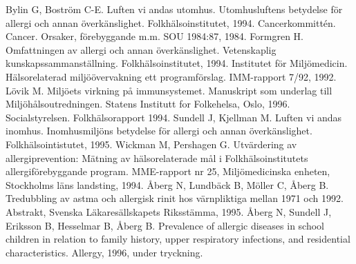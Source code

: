 Bylin G, Boström C-E. Luften vi andas utomhus. Utomhusluftens betydelse för allergi och annan överkänslighet. Folkhälsoinstitutet, 1994.
Cancerkommittén. Cancer. Orsaker, förebyggande m.m. SOU 1984:87, 1984.
Formgren H. Omfattningen av allergi och annan överkänslighet. Vetenskaplig kunskapssammanställning. Folkhälsoinstitutet, 1994.
Institutet för Miljömedicin. Hälsorelaterad miljöövervakning ett programförslag. IMM-rapport 7/92, 1992.
Lövik M. Miljöets virkning på immunsystemet. Manuskript som underlag till Miljöhålsoutredningen. Statens Institutt for Folkehelsa, Oslo, 1996.
Socialstyrelsen. Folkhälsorapport 1994.
Sundell J, Kjellman M. Luften vi andas inomhus. Inomhusmiljöns betydelse för allergi och annan överkänslighet. Folkhälsointistutet, 1995.
Wickman M, Pershagen G. Utvärdering av allergiprevention: Mätning av hälsorelaterade mål i Folkhälsoinstitutets allergiförebyggande program. MME-rapport nr 25, Miljömedicinska enheten, Stockholms läns landsting, 1994.
Åberg N, Lundbäck B, Möller C, Åberg B. Tredubbling av astma och allergisk rinit hos värnpliktiga mellan 1971 och 1992. Abstrakt, Svenska Läkaresällskapets Riksstämma, 1995.
Åberg N, Sundell J, Eriksson B, Hesselmar B, Åberg B. Prevalence of allergic diseases in school children in relation to family history, upper respiratory infections, and residential characteristics. Allergy, 1996, under tryckning.

